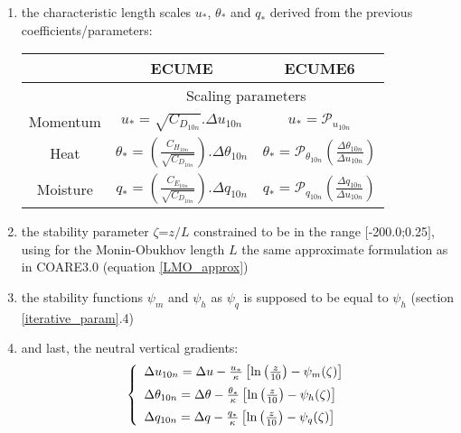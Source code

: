 \begin{enumerate}
	\item the characteristic length scales $u_*$, ${\theta}_*$ and $q_*$ derived from the previous coefficients/parameters:
		\begin{center}
\begin{tabular}{|c|c|c|}
\hline
	 & ECUME & ECUME6 \\
\hline
	 & \multicolumn{2}{c|}{Scaling parameters}\\
	Momentum & $u_*=\sqrt{C_{D_{10n}}}.\Delta u_{10n}$  & $u_*=\mathcal{P}_{u_{10n}}$ \\
	Heat     & ${\theta}_*=\left(\frac{C_{H_{10n}}}{\sqrt{C_{D_{10n}}}}\right).\Delta {\theta}_{10n}$  
			& ${\theta}_*=\mathcal{P}_{{\theta}_{10n}}\left(\frac{\Delta {\theta}_{10n}}{\Delta u_{10n}}\right)$ \\
	Moisture     & $q_*=\left(\frac{C_{E_{10n}}}{\sqrt{C_{D_{10n}}}}\right).\Delta q_{10n}$  
			& $q_*=\mathcal{P}_{q_{10n}}\left(\frac{\Delta q_{10n}}{\Delta u_{10n}}\right)$ \\
\hline
\end{tabular}
		\end{center}
	\item the stability parameter $\zeta$=$z/L$ constrained to be in the range $[$-200.0;0.25$]$,
using for the Monin-Obukhov length $L$ the same approximate formulation as in COARE3.0
(equation \ref{LMO_approx})
	\item the stability functions $\psi_{m}$ and $\psi_{h}$ as $\psi_{q}$ is supposed to be equal to $\psi_{h}$ (section \ref{iterative_param}.4)
	\item and last, the neutral vertical gradients:
$$
\left\{
\begin{array}{l}
\vspace*{0.2 cm}
	\Delta u_{10n}=\Delta u - \frac{u_*}{\kappa}\left[\ln\left(\frac{z}{10}\right)-{\psi}_m(\zeta)\right]\\
\vspace*{0.2 cm}
	\Delta {\theta}_{10n}=\Delta {\theta} - \frac{{\theta}_*}{\kappa}\left[\ln\left(\frac{z}{10}\right)-{\psi}_h(\zeta)\right]\\
	\Delta q_{10n}=\Delta q - \frac{q_*}{\kappa}\left[\ln\left(\frac{z}{10}\right)-{\psi}_q(\zeta)\right]
\end{array}
\right.
$$
\end{enumerate}

